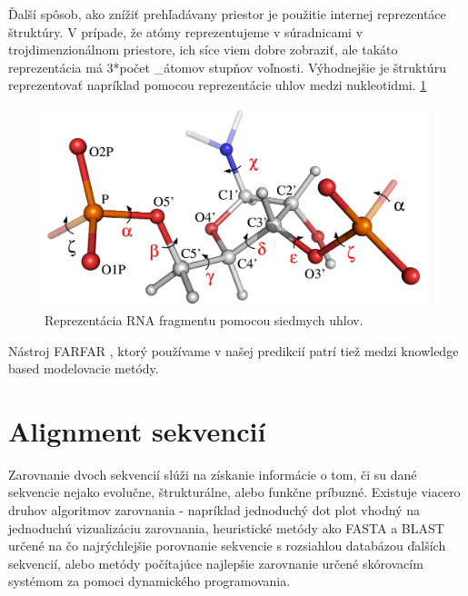 \indent Ďalší spôsob, ako znížiť  prehľadávany priestor je použitie internej reprezentáce štruktúry. V prípade, že atómy reprezentujeme v súradnicami v trojdimenzionálnom priestore, ich síce viem dobre zobraziť, ale takáto reprezentácia má 3*počet \_átomov stupňov voľnosti. Výhodnejšie je štruktúru reprezentovať napríklad pomocou reprezentácie uhlov medzi nukleotidmi.  \ref{obr02:reptesentation}


\begin{figure}%
\includegraphics[width=\textwidth]{../img/str_reprezentace_uhly}
\caption{Reprezentácia RNA fragmentu pomocou siedmych uhlov. \cite{Frellsen09} }
\label{obr02:reptesentation}
\end{figure}


\indent Nástroj FARFAR \cite{Das10}, ktorý používame v našej predikcií patrí tiež medzi knowledge based modelovacie metódy.


\section{Alignment sekvencií}
Zarovnanie dvoch sekvencií slúži na získanie informácie o tom, či su dané sekvencie nejako evolučne, štrukturálne, alebo funkčne príbuzné. Existuje viacero druhov algoritmov zarovnania - napríklad jednoduchý dot plot vhodný na jednoduchú vizualizáciu zarovnania, heuristické metódy ako FASTA a BLAST určené na čo najrýchlejšie porovnanie sekvencie s rozsiahlou databázou ďalších sekvencií, alebo metódy počítajúce najlepšie zarovnanie určené skórovacím systémom za pomoci dynamického programovania.


